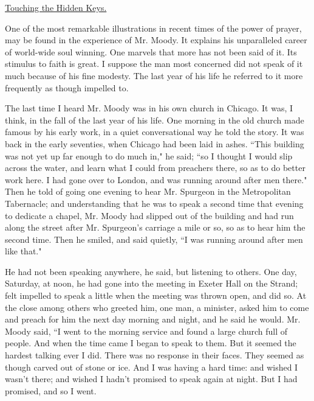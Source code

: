 \underline{Touching the Hidden Keys.}


One of the most remarkable illustrations in recent times of the power of
prayer, may be found in the experience of Mr. Moody. It explains his
unparalleled career of world-wide soul winning. One marvels that more has
not been said of it. Its stimulus to faith is great. I suppose the man
most concerned did not speak of it much because of his fine modesty. The
last year of his life he referred to it more frequently as though impelled
to.

The last time I heard Mr. Moody was in his own church in Chicago. It was,
I think, in the fall of the last year of his life. One morning in the old
church made famous by his early work, in a quiet conversational way he
told the story. It was back in the early seventies, when Chicago had been
laid in ashes. ``This building was not yet up far enough to do much in," he
said; ``so I thought I would slip across the water, and learn what I could
from preachers there, so as to do better work here. I had gone over to
London, and was running around after men there." Then he told of going
one evening to hear Mr. Spurgeon in the Metropolitan Tabernacle; and
understanding that he was to speak a second time that evening to dedicate
a chapel, Mr. Moody had slipped out of the building and had run along the
street after Mr. Spurgeon's carriage a mile or so, so as to hear him the
second time. Then he smiled, and said quietly, ``I was running around after
men like that."

He had not been speaking anywhere, he said, but listening to others. One
day, Saturday, at noon, he had gone into the meeting in Exeter Hall on the
Strand; felt impelled to speak a little when the meeting was thrown open,
and did so. At the close among others who greeted him, one man, a
minister, asked him to come and preach for him the next day morning and
night, and he said he would. Mr. Moody said, ``I went to the morning
service and found a large church full of people. And when the time came I
began to speak to them. But it seemed the hardest talking ever I did.
There was no response in their faces. They seemed as though carved out of
stone or ice. And I was having a hard time: and wished I wasn't there; and
wished I hadn't promised to speak again at night. But I had promised, and
so I went.


